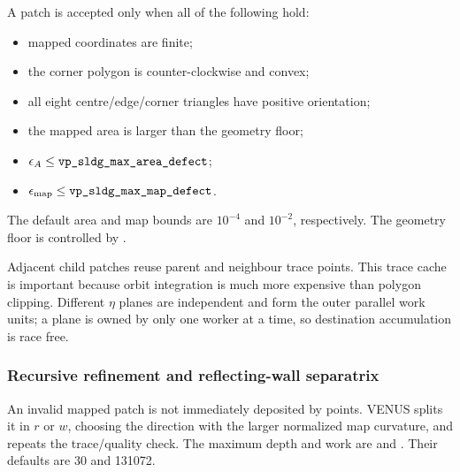A patch is accepted only when all of the following hold:
\begin{itemize}
\item mapped coordinates are finite;
\item the corner polygon is counter-clockwise and convex;
\item all eight centre/edge/corner triangles have positive orientation;
\item the mapped area is larger than the geometry floor;
\item \(\epsilon_A\le\code{vp_sldg_max_area_defect}\);
\item \(\epsilon_{\rm map}\le\code{vp_sldg_max_map_defect}\).
\end{itemize}
The default area and map bounds are \(10^{-4}\) and \(10^{-2}\),
respectively.  The geometry floor is controlled by
.

Adjacent child patches reuse parent and neighbour trace points.  This trace
cache is important because orbit integration is much more expensive than
polygon clipping.  Different \(\eta\) planes are independent and form the
outer parallel work units; a plane is owned by only one worker at a time, so
destination accumulation is race free.

\subsubsection{Recursive refinement and reflecting-wall separatrix}

An invalid mapped patch is not immediately deposited by points.  VENUS splits
it in \(r\) or \(w\), choosing the direction with the larger normalized map
curvature, and repeats the trace/quality check.  The maximum depth and work are
 and
.  Their defaults are 30 and 131072.

